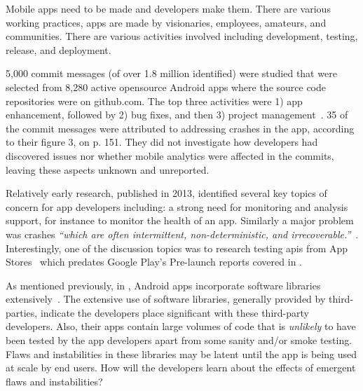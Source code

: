Mobile apps need to be made and developers make them. There are various working practices, apps are made by visionaries, employees, amateurs, and communities. There are various activities involved including development, testing, release, and deployment. %


5,000 commit messages (of over 1.8 million identified) were studied that were selected from 8,280 active opensource Android apps where the source code repositories were on github.com. The top three activities were 1) app enhancement, followed by 2) bug fixes, and then 3) project management~. 35 of the commit messages were attributed to addressing crashes in the app, according to their figure 3, on p. 151. They did not investigate how developers had discovered issues nor whether mobile analytics were affected in the commits, leaving these aspects unknown and unreported.

Relatively early research, published in 2013, identified several key topics of concern for app developers including: a strong need for monitoring and analysis support, for instance to monitor the health of an app. Similarly a major problem was crashes \emph{``which are often intermittent, non-deterministic, and irrecoverable.''}~. Interestingly, one of the discussion topics was to research testing \acrshort{api}s from App Stores~ which predates Google Play's Pre-launch reports covered in .


As mentioned previously, in , Android apps incorporate software libraries extensively~. The extensive use of software libraries, generally provided by third-parties, indicate the developers place significant  with these third-party developers. Also, their apps contain large volumes of code that is \emph{unlikely} to have been tested by the app developers apart from some sanity and/or smoke testing. Flaws and instabilities in these libraries may be latent until the app is being used at scale by end users. How will the developers learn about the effects of emergent flaws and instabilities?

